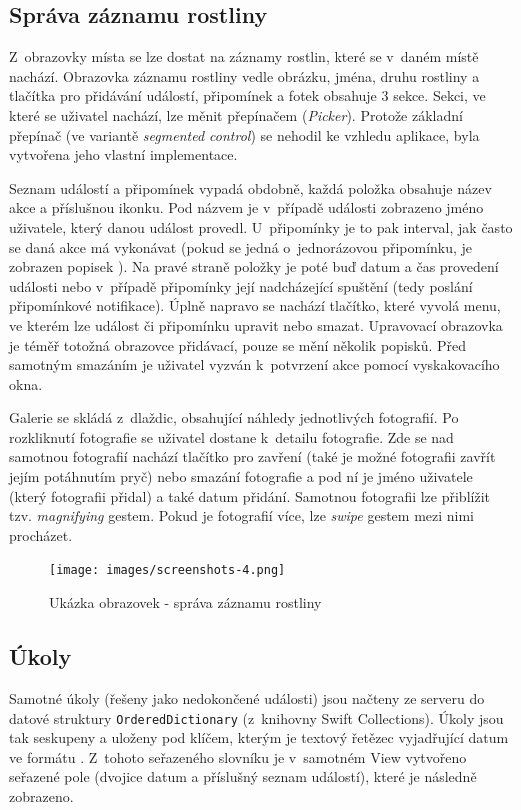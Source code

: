 \documentclass[thesis=M,czech]{FITthesis}[2019/12/23]
\begin{document}
\subsection{Správa záznamu rostliny}
Z~obrazovky místa se lze dostat na záznamy rostlin, které se v~daném místě nachází. Obrazovka záznamu rostliny vedle obrázku, jména, druhu rostliny a tlačítka pro přidávání událostí, připomínek a fotek obsahuje 3 sekce. Sekci, ve které se uživatel nachází, lze měnit přepínačem (\textit{Picker}). Protože základní přepínač (ve variantě \textit{segmented control}) se nehodil ke vzhledu aplikace, byla vytvořena jeho vlastní implementace.

Seznam událostí a připomínek vypadá obdobně, každá položka obsahuje název akce a příslušnou ikonku. Pod názvem je v~případě události zobrazeno jméno uživatele, který danou událost provedl. U~připomínky je to pak interval, jak často se daná akce má vykonávat (pokud se jedná o~jednorázovou připomínku, je zobrazen popisek ). Na pravé straně položky je poté buď datum a čas provedení události nebo v~případě připomínky její nadcházející spuštění (tedy poslání připomínkové notifikace). Úplně napravo se nachází tlačítko, které vyvolá menu, ve kterém lze událost či připomínku upravit nebo smazat. Upravovací obrazovka je téměř totožná obrazovce přidávací, pouze se mění několik popisků. Před samotným smazáním je uživatel vyzván k~potvrzení akce pomocí vyskakovacího okna.

Galerie se skládá z~dlaždic, obsahující náhledy jednotlivých fotografií. Po rozkliknutí fotografie se uživatel dostane k~detailu fotografie. Zde se nad samotnou fotografií nachází tlačítko pro zavření (také je možné fotografii zavřít jejím potáhnutím pryč) nebo smazání fotografie a pod ní je jméno uživatele (který fotografii přidal) a také datum přidání. Samotnou fotografii lze přiblížit tzv. \textit{magnifying} gestem. Pokud je fotografií více, lze \textit{swipe} gestem mezi nimi procházet.

\begin{figure}
	\centering
	\texttt{[image: images/screenshots-4.png]}
  	\caption{Ukázka obrazovek - správa záznamu rostliny}
  	\label{img:screenshots-4}
\end{figure}

\subsection{Úkoly}
Samotné úkoly (řešeny jako nedokončené události) jsou načteny ze serveru do datové struktury \texttt{OrderedDictionary} (z~knihovny Swift Collections). Úkoly jsou tak seskupeny a uloženy pod klíčem, kterým je textový řetězec vyjadřující datum ve formátu . Z~tohoto seřazeného slovníku je v~samotném View vytvořeno seřazené pole (dvojice datum a příslušný seznam událostí), které je následně zobrazeno.
\end{document}

